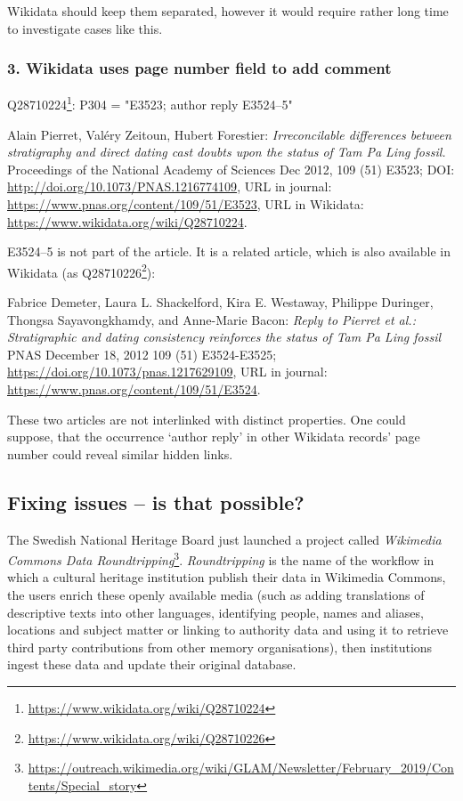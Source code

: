 Wikidata should keep them separated, however it would require rather long time to investigate cases like this.

\subsubsection{3. Wikidata uses page number field to add comment}

Q28710224\footnote{\url{https://www.wikidata.org/wiki/Q28710224}}: P304 = "E3523; author reply E3524–5"

Alain Pierret, Valéry Zeitoun, Hubert Forestier: \emph{Irreconcilable differences between stratigraphy and direct dating cast doubts upon the status of Tam Pa Ling fossil.} Proceedings of the National Academy of Sciences Dec 2012, 109 (51) E3523; DOI: \url{http://doi.org/10.1073/PNAS.1216774109}, URL in journal: \url{https://www.pnas.org/content/109/51/E3523}, URL in Wikidata: \url{https://www.wikidata.org/wiki/Q28710224}.

E3524–5 is not part of the article. It is a related article, which is also available in Wikidata (as Q28710226\footnote{\url{https://www.wikidata.org/wiki/Q28710226}}):

Fabrice Demeter, Laura L. Shackelford, Kira E. Westaway, Philippe Duringer, Thongsa Sayavongkhamdy, and Anne-Marie Bacon: \emph{Reply to Pierret et al.: Stratigraphic and dating consistency reinforces the status of Tam Pa Ling fossil} PNAS December 18, 2012 109 (51) E3524-E3525; \url{https://doi.org/10.1073/pnas.1217629109}, URL in journal: \url{https://www.pnas.org/content/109/51/E3524}.

These two articles are not interlinked with distinct properties. One could suppose, that the occurrence `author reply' in other Wikidata records' page number could reveal similar hidden links.

\subsection{Fixing issues -- is that possible?}

The Swedish National Heritage Board just launched a project called \emph{Wikimedia Commons Data Roundtripping}\footnote{\url{https://outreach.wikimedia.org/wiki/GLAM/Newsletter/February_2019/Contents/Special_story}}. \emph{Roundtripping} is the name of the workflow in which a cultural heritage institution publish their data in Wikimedia Commons, the users enrich these openly available media (such as adding translations of descriptive texts into other languages, identifying people, names and aliases, locations and subject matter or linking to authority data and using it to retrieve third party contributions from other memory organisations), then institutions ingest these data and update their original database.

